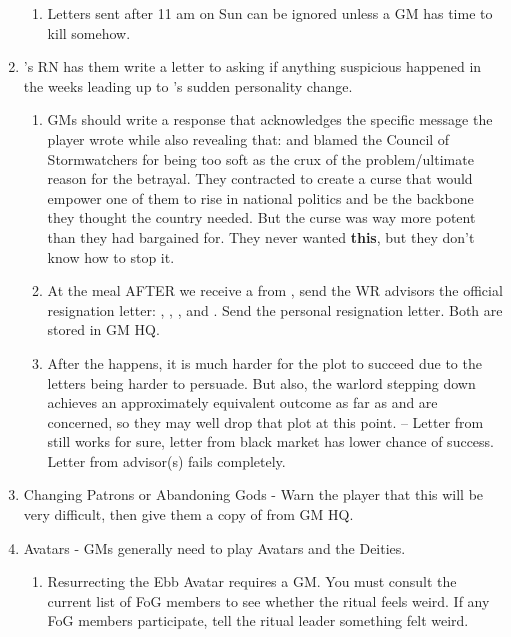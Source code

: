 \documentclass[green]{GL2020}
\begin{document}
\begin{enumerate}
\begin{enumerate}
		\item Letters sent after 11 am on Sun can be ignored unless a GM has time to kill somehow.
	\end{enumerate}
	\item \cWarlordDaughter{}’s RN has them write a letter to \cQuiet{} asking if anything suspicious happened in the weeks leading up to \cLoud{}'s sudden personality change.
	\begin{enumerate}
		\item GMs should write a response that acknowledges the specific message the player wrote while also revealing that: \cLoud{} and \cQuiet{} blamed the Council of Stormwatchers for being too soft as the crux of the problem/ultimate reason for the betrayal. They contracted \cCurse{\full} to create a curse that would empower one of them to rise in national politics and be the backbone they thought the country needed. But the curse was way more potent than they had bargained for. They never wanted \textbf{this}, but they don’t know how to stop it.
		\item At the meal AFTER we receive a \iPanacea{} from \cWarlordDaughter{}, send the WR advisors the official resignation letter: \cChupLeader{}, \cJuniorStatesman{}, \cBunker{}, and \cEbbPriest{}. Send \cWarlordDaughter{} the personal resignation letter. Both are stored in GM HQ.
		\item After the \iPanacea{} happens, it is much harder for the \gAssassinateWarlord{} plot to succeed due to the letters being harder to persuade. But also, the warlord stepping down achieves an approximately equivalent outcome as far as \cEvil{} and \cDiplomat{} are concerned, so they may well drop that plot at this point. -- Letter from \cWarlordDaughter{} still works for sure, letter from black market has lower chance of success. Letter from advisor(s) fails completely.
	\end{enumerate}
	\item Changing Patrons or Abandoning Gods - Warn the player that this will be very difficult, then give them a copy of \gAbandonGods{} from GM HQ.
	\item Avatars - GMs generally need to play Avatars and the Deities.
	\begin{enumerate}
		\item Resurrecting the Ebb Avatar requires a GM. You must consult the current list of FoG members to see whether the ritual feels weird. If any FoG members participate, tell the ritual leader something felt weird.
		\begin{enumerate}

\end{enumerate}
\end{enumerate}
\end{enumerate}
\end{document}
